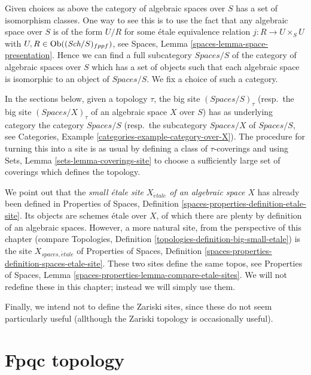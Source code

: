 \medskip\noindent
Given choices as above the category of algebraic spaces over $S$
has a set of isomorphism classes. One way to see this is to use the
fact that any algebraic space over $S$ is of the form $U/R$ for
some \'etale equivalence relation $j : R \to U \times_S U$ with
$U, R \in \mathop{\rm Ob}\nolimits((\textit{Sch}/S)_{fppf})$, see
Spaces, Lemma \ref{spaces-lemma-space-presentation}.
Hence we can find a full subcategory $\textit{Spaces}/S$ of the category of
algebraic spaces over $S$ which has a set of objects
such that each algebraic space is isomorphic to an object of
$\textit{Spaces}/S$. We fix a choice of such a category.

\medskip\noindent
In the sections below, given a topology $\tau$, the big site
$(\textit{Spaces}/S)_\tau$ (resp.\ the big site $(\textit{Spaces}/X)_\tau$
of an algebraic space $X$ over $S$)
has as underlying category the category $\textit{Spaces}/S$
(resp.\ the subcategory $\textit{Spaces}/X$ of $\textit{Spaces}/S$, see
Categories, Example \ref{categories-example-category-over-X}).
The procedure for turning this into a site is as usual by defining a
class of $\tau$-coverings and using
Sets, Lemma \ref{sets-lemma-coverings-site}
to choose a sufficiently large set of coverings which defines the topology.

\medskip\noindent
We point out that the {\it small \'etale site $X_{\acute{e}tale}$
of an algebraic space $X$} has already been defined in
Properties of Spaces, Definition
\ref{spaces-properties-definition-etale-site}.
Its objects are schemes \'etale over $X$, of which there are plenty
by definition of an algebraic spaces. However,
a more natural site, from the perspective of this chapter (compare
Topologies, Definition \ref{topologies-definition-big-small-etale})
is the site $X_{spaces, \acute{e}tale}$ of
Properties of Spaces, Definition
\ref{spaces-properties-definition-spaces-etale-site}.
These two sites define the same topos, see
Properties of Spaces, Lemma \ref{spaces-properties-lemma-compare-etale-sites}.
We will not redefine these in this chapter; instead we will simply
use them.

\medskip\noindent
Finally, we intend not to define the Zariski sites, since these do not
seem particularly useful (allthough the Zariski topology
is occasionally useful).




\section{Fpqc topology}
\label{section-fpqc}

